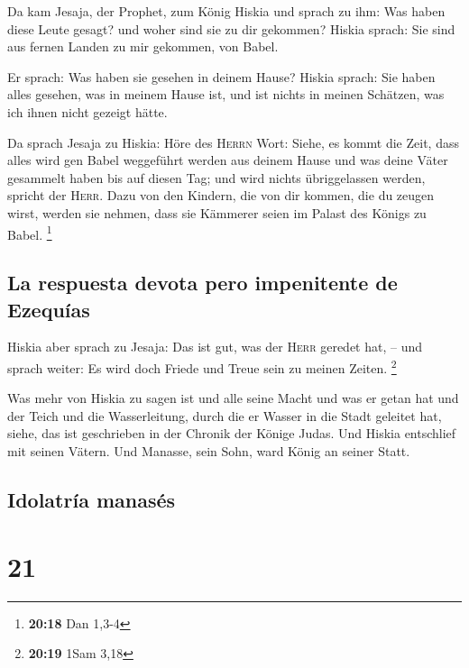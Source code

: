  Da kam Jesaja, der Prophet, zum König Hiskia und sprach
zu ihm: Was haben diese Leute gesagt? und woher sind sie zu dir
gekommen? Hiskia sprach: Sie sind aus fernen Landen zu mir gekommen, von
Babel.

 Er sprach: Was haben sie gesehen in deinem Hause? Hiskia
sprach: Sie haben alles gesehen, was in meinem Hause ist, und ist nichts
in meinen Schätzen, was ich ihnen nicht gezeigt hätte.

 Da sprach Jesaja zu Hiskia: Höre des \textsc{Herrn}
Wort:  Siehe, es kommt die Zeit, dass alles wird gen
Babel weggeführt werden aus deinem Hause und was deine Väter gesammelt
haben bis auf diesen Tag; und wird nichts übriggelassen werden, spricht
der \textsc{Herr}.  Dazu von den Kindern, die von dir
kommen, die du zeugen wirst, werden sie nehmen, dass sie Kämmerer seien
im Palast des Königs zu Babel. \footnote{\textbf{20:18} Dan 1,3-4}

\hypertarget{la-respuesta-devota-pero-impenitente-de-ezequuxedas}{%
\subsection{La respuesta devota pero impenitente de
Ezequías}\label{la-respuesta-devota-pero-impenitente-de-ezequuxedas}}

 Hiskia aber sprach zu Jesaja: Das ist gut, was der
\textsc{Herr} geredet hat, -- und sprach weiter: Es wird doch Friede und
Treue sein zu meinen Zeiten. \footnote{\textbf{20:19} 1Sam 3,18}

 Was mehr von Hiskia zu sagen ist und alle seine Macht
und was er getan hat und der Teich und die Wasserleitung, durch die er
Wasser in die Stadt geleitet hat, siehe, das ist geschrieben in der
Chronik der Könige Judas.  Und Hiskia entschlief mit
seinen Vätern. Und Manasse, sein Sohn, ward König an seiner Statt.

\hypertarget{idolatruxeda-manasuxe9s}{%
\subsection{Idolatría manasés}\label{idolatruxeda-manasuxe9s}}

\hypertarget{section-20}{%
\section{21}\label{section-20}}

